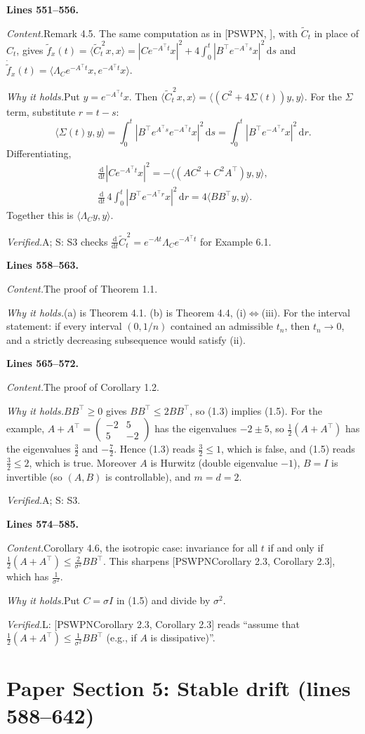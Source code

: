\documentclass[11pt]{amsart}
\newcommand{\dd}{\,\mathrm{d}}
\newcommand{\Ct}{\widetilde{C}_t}
\newcommand{\ip}[2]{\langle #1,#2\rangle}
\newcommand{\tp}{\top}
\newcommand{\src}[1]{\par\bigskip\noindent\textbf{Lines #1.}\enspace}
\newcommand{\content}{\par\smallskip\noindent\textit{Content.}\enspace}
\newcommand{\why}{\par\smallskip\noindent\textit{Why it holds.}\enspace}
\newcommand{\verified}{\par\smallskip\noindent\textit{Verified.}\enspace}
\newcommand{\tA}{\textsf{A}}
\newcommand{\tS}{\textsf{S}}
\newcommand{\tL}{\textsf{L}}
\newcommand{\PS}[1][]{[PSWPN\ifx\relax#1\relax\else, #1\fi]}
\begin{document}
\src{551--556}
\content Remark 4.5. The same computation as in \PS, with $\Ct$ in place of $C_t$, gives
$\widetilde f_x(t)=\ip{\Ct^{\,2}x}x=|Ce^{-A^\tp t}x|^2+4\int_0^t|B^\tp e^{-A^\tp s}x|^2\dd s$ and
$\dot{\widetilde f}_x(t)=\ip{\Lambda_Ce^{-A^\tp t}x}{e^{-A^\tp t}x}$.
\why Put $y=e^{-A^\tp t}x$. Then $\ip{\Ct^{\,2}x}x=\ip{(C^2+4\Sigma(t))y}y$. For the $\Sigma$ term, substitute
$r=t-s$:
\[
\ip{\Sigma(t)y}y=\int_0^t|B^\tp e^{A^\tp s}e^{-A^\tp t}x|^2\dd s=\int_0^t|B^\tp e^{-A^\tp r}x|^2\dd r .
\]
Differentiating,
\begin{gather*}
\frac{\mathrm d}{\mathrm dt}|Ce^{-A^\tp t}x|^2=-\ip{(AC^2+C^2A^\tp)y}y,\\
\frac{\mathrm d}{\mathrm dt}\,4\int_0^t|B^\tp e^{-A^\tp r}x|^2\dd r=4\ip{BB^\tp y}y .
\end{gather*}
Together this is $\ip{\Lambda_Cy}y$.
\verified \tA; \tS: S3 checks $\frac{\mathrm d}{\mathrm dt}\Ct^{\,2}=e^{-At}\Lambda_Ce^{-A^\tp t}$ for Example 6.1.

\src{558--563}
\content The proof of Theorem 1.1.
\why (a) is Theorem 4.1. (b) is Theorem 4.4, (i)$\iff$(iii). For the interval statement: if every interval
$(0,1/n)$ contained an admissible $t_n$, then $t_n\to0$, and a strictly decreasing subsequence would satisfy (ii).

\src{565--572}
\content The proof of Corollary 1.2.
\why $BB^\tp\ge0$ gives $BB^\tp\le2BB^\tp$, so (1.3) implies (1.5). For the example, $A+A^\tp=\begin{pmatrix}-2&5\\5&-2
\end{pmatrix}$ has the eigenvalues $-2\pm5$, so $\frac12(A+A^\tp)$ has the eigenvalues $\frac32$ and $-\frac72$.
Hence (1.3) reads $\frac32\le1$, which is false, and (1.5) reads $\frac32\le2$, which is true. Moreover $A$ is Hurwitz
(double eigenvalue $-1$), $B=I$ is invertible (so $(A,B)$ is controllable), and $m=d=2$.
\verified \tA; \tS: S3.

\src{574--585}
\content Corollary 4.6, the isotropic case: invariance for all $t$ if and only if
$\frac12(A+A^\tp)\le\frac2{\sigma^2}BB^\tp$. This sharpens \PS[Corollary 2.3], which has $\frac1{\sigma^2}$.
\why Put $C=\sigma I$ in (1.5) and divide by $\sigma^2$.
\verified \tL: \PS[Corollary 2.3] reads ``assume that $\frac12(A+A^\top)\le\frac1{\sigma^2}BB^\top$ (e.g., if $A$ is
dissipative)''.

\section{Paper Section 5: Stable drift (lines 588--642)}\label{sec:geom}
\end{document}
